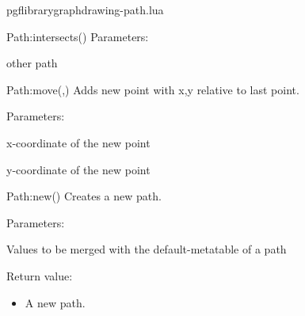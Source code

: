 \begin{filedescription}{pgflibrarygraphdrawing-path.lua}
\begin{luacommand}{{Path:intersects}()}
Parameters:
\begin{parameterdescription}
	\item[\meta{path}] other path
\end{parameterdescription}



\end{luacommand}\begin{luacommand}{{Path:move}(,)}
Adds new point with x,y relative to last point.

Parameters:
\begin{parameterdescription}
	\item[\meta{x}] x-coordinate of the new point\item[\meta{y}] y-coordinate of the new point
\end{parameterdescription}



\end{luacommand}\begin{luacommand}{{Path:new}()}
Creates a new path.

Parameters:
\begin{parameterdescription}
	\item[\meta{values}] Values to be merged with the default-metatable of a path
\end{parameterdescription}


Return value:
\begin{itemize} \item[] A new path. \end{itemize}


\end{luacommand}
\end{filedescription}